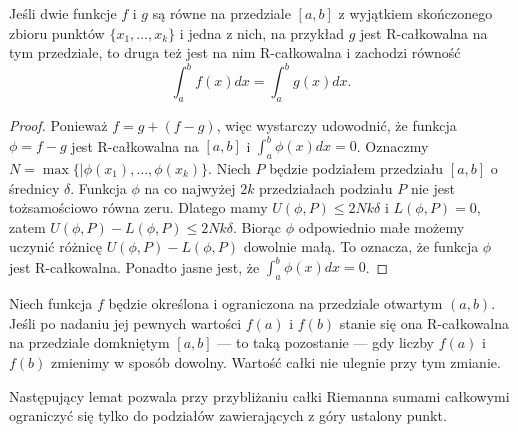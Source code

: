 \documentclass[leqno]{article}
\begin{document}
\begin{justify}
\begin{theorem}
    {Jeśli dwie funkcje $f$ i $g$ są równe na przedziale $[a,b]$ z wyjątkiem skończonego zbioru punktów ${\{x_1, \ldots, x_k\}}$
    i jedna z nich, na przykład $g$ jest R-całkowalna na tym przedziale, to druga też jest na nim R-całkowalna i zachodzi równość
    \[
        \int_{a}^{b}f(x)dx = \int_{a}^{b}g(x)dx.
    \]}
\end{theorem}
\begin{proof}
    Ponieważ $f = g + (f-g)$, więc wystarczy udowodnić, że funkcja $\phi = f - g$ jest R-całkowalna na $[a,b]$ i $\int_{a}^{b}\phi(x)dx = 0$.
    Oznaczmy $N = \max\{|\phi(x_1), \ldots, \phi(x_k)\}$. Niech $P$ będzie podziałem przedziału $[a,b]$ o średnicy $\delta$.
    Funkcja $\phi$ na co najwyżej $2k$ przedziałach podziału $P$ nie jest tożsamościowo równa zeru.
    Dlatego mamy $U(\phi, P) \leqslant 2Nk\delta$ i $L(\phi, P) = 0$, zatem $U(\phi, P) - L(\phi, P) \leqslant 2Nk\delta$. 
    Biorąc $\phi$ odpowiednio małe możemy uczynić różnicę $U(\phi, P) - L(\phi, P)$ dowolnie małą. To oznacza, że funkcja $\phi$ jest
    R-całkowalna. Ponadto jasne jest, że $\int_{a}^{b}\phi(x)dx = 0$.
\end{proof}

\begin{wniosek}
{Niech funkcja $f$ będzie określona i ograniczona na przedziale otwartym $(a,b)$. Jeśli po nadaniu jej pewnych wartości
$f(a)$ i $f(b)$ stanie się ona R-całkowalna na przedziale domkniętym $[a,b]$ --- to taką pozostanie --- gdy liczby $f(a)$ i $f(b)$ zmienimy
w sposób dowolny. Wartość całki nie ulegnie przy tym zmianie.}
\end{wniosek}

Następujący lemat pozwala przy przybliżaniu całki Riemanna sumami całkowymi ograniczyć się tylko do podziałów zawierających z góry ustalony punkt.


\end{justify}
\end{document}
